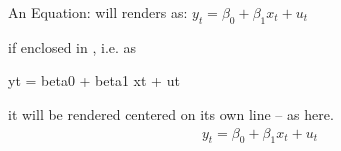 \documentclass[letterpaper,10pt,english]{jupyterBook}
\begin{document}
\sphinxAtStartPar
An Equation:  will renders as: \(y_t = \beta_0 + \beta_1 x_t + u_t\)

\sphinxAtStartPar
if enclosed in \sphinxcode{\sphinxupquote{\$\$}} \sphinxcode{\sphinxupquote{\$\$}}, i.e.  as

\begin{sphinxVerbatim}[commandchars=\\\{\}]
\PYGZdl{}\PYGZdl{}y\PYGZus{}t = \PYGZbs{}beta\PYGZus{}0 + \PYGZbs{}beta\PYGZus{}1 x\PYGZus{}t + u\PYGZus{}t\PYGZdl{}\PYGZdl{}
\end{sphinxVerbatim}

\sphinxAtStartPar
it will be rendered centered on its own line – as here.
\begin{equation*}
\begin{split}y_t = \beta_0 + \beta_1 x_t + u_t\end{split}
\end{equation*}
\end{document}
